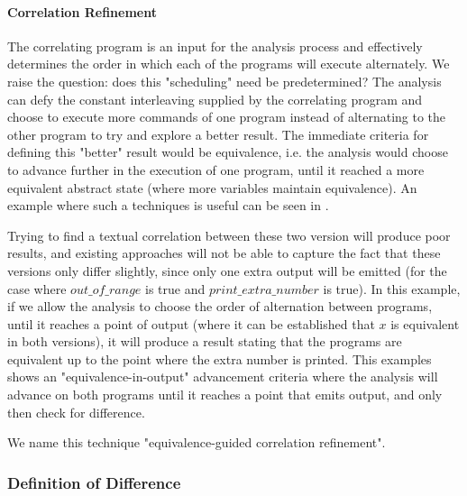 \paragraph{Correlation Refinement} The correlating program is an input for the analysis process and effectively determines the order in which each of the programs will execute alternately. We raise the question: does this "scheduling" need be predetermined? The analysis can defy the constant interleaving supplied by the correlating program and choose to execute more commands of one program instead of alternating to the other program to try and explore a better result. The immediate criteria for defining this "better" result would be equivalence, i.e. the analysis would choose to advance further in the execution of one program, until it reached a more equivalent abstract state (where more variables maintain equivalence). An example where such a techniques is useful can be seen in .



Trying to find a textual correlation between these two version will produce poor results, and existing approaches will not be able to capture the fact that these versions only differ slightly, since only one extra output will be emitted (for the case where $out\_of\_range$ is true and $print\_extra\_number$ is true). In this example, if we allow the analysis to choose the order of alternation between programs, until it reaches a point of output (where it can be established that $x$ is equivalent in both versions), it will produce a result stating that the programs are equivalent up to the point where the extra number is printed. This examples shows an "equivalence-in-output" advancement criteria where the analysis will advance on both programs until it reaches a point that emits output, and only then check for difference.

We name this technique "equivalence-guided correlation refinement".

\subsubsection{Definition of Difference}

